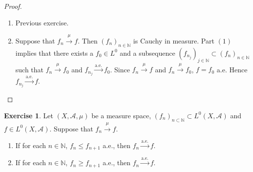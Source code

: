 \documentclass{book}
\theoremstyle{definition}
\newtheorem{ex}[definition]{Exercise}
\newcommand{\N}{\mathbb{N}}
\newcommand{\MA}{\mathcal{A}}
\DeclareMathOperator*{\0}{\mbf{0}}
\DeclareMathOperator*{\1}{\mbf{1}}
\newcommand{\convt}[1]{\xrightarrow{\text{#1}}}
\newcommand{\conv}[1]{\xrightarrow{#1}}
\begin{document}
	\begin{proof}\
	\begin{enumerate}
		\item Previous exercise.
		\item Suppose that $f_n \conv{\mu} f$. Then $(f_n)_{n \in \N}$ is Cauchy in measure. Part $(1)$ implies that there exists a $f_0 \in L^0$ and a subsequence $(f_{n_j})_{j \in \N} \subset (f_n)_{n \in \N}$ such that $f_n \conv{\mu} f_0$ and $f_{n_j} \convt{a.e.} f_0$. Since $f_n \conv{\mu} f$ and $f_n \conv{\mu} f_0$, $f = f_0$ a.e. Hence $f_{n_j} \convt{a.e.} f$.
	\end{enumerate}
	\end{proof}

	\begin{ex}
		Let $(X, \MA, \mu)$ be a measure space, $(f_n)_{n \subset \N} \subset L^0(X, \MA)$ and $f \in  L^0(X, \MA)$. Suppose that $f_n \conv{\mu} f$. 
		\begin{enumerate}
			\item If for each $n \in \N$, $f_n \leq f_{n+1}$ a.e., then $f_n \convt{a.e.} f$. 
			\item If for each $n \in \N$, $f_n \geq f_{n+1}$ a.e., then $f_n \convt{a.e.} f$. 
		\end{enumerate}
	\end{ex}
\end{document}
